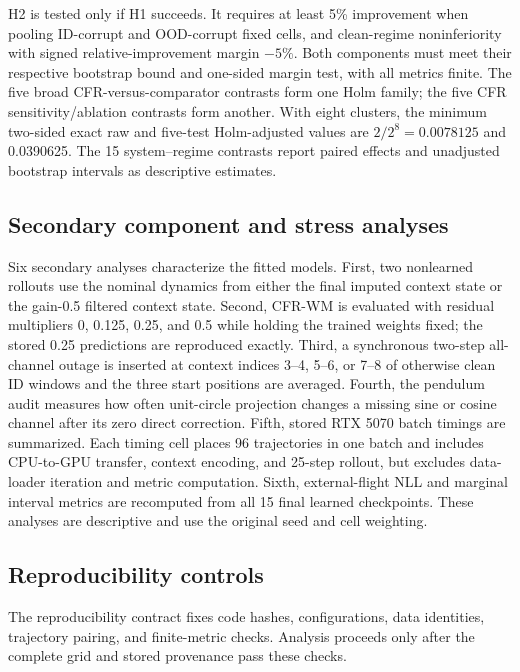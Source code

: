\documentclass[pdflatex,sn-basic]{sn-jnl}
\begin{document}
H2 is tested only if H1 succeeds. It requires at least 5\% improvement when
pooling ID-corrupt and OOD-corrupt fixed cells, and clean-regime
noninferiority with signed relative-improvement margin $-5\%$. Both components
must meet their respective bootstrap bound and one-sided margin test, with all
metrics finite. The five broad CFR-versus-comparator contrasts form one Holm
family; the five CFR sensitivity/ablation contrasts form another. With eight
clusters, the minimum two-sided exact raw and five-test Holm-adjusted values are
$2/2^8=0.0078125$ and 0.0390625. The 15 system--regime contrasts report paired
effects and unadjusted bootstrap intervals as descriptive estimates.

\subsection{Secondary component and stress analyses}

Six secondary analyses characterize the fitted models. First, two nonlearned
rollouts use the nominal dynamics from either the
final imputed context state or the gain-0.5 filtered context state. Second,
CFR-WM is evaluated with residual multipliers 0, 0.125, 0.25, and 0.5 while
holding the trained weights fixed; the stored 0.25 predictions are reproduced
exactly. Third, a synchronous two-step
all-channel outage is inserted at context indices 3--4, 5--6, or 7--8 of
otherwise clean ID windows and the three start positions are averaged. Fourth,
the pendulum audit measures how often unit-circle projection changes a missing
sine or cosine channel after its zero direct correction. Fifth, stored RTX 5070
batch timings are summarized. Each timing cell places 96 trajectories in one
batch and includes CPU-to-GPU transfer, context encoding, and 25-step rollout,
but excludes data-loader iteration and metric computation. Sixth,
external-flight NLL and marginal interval metrics are recomputed from all 15
final learned checkpoints. These analyses are descriptive and use the original
seed and cell weighting.

\subsection{Reproducibility controls}

The reproducibility contract fixes code hashes, configurations, data identities,
trajectory pairing, and finite-metric checks. Analysis proceeds only after the
complete grid and stored provenance pass these checks.
\end{document}
